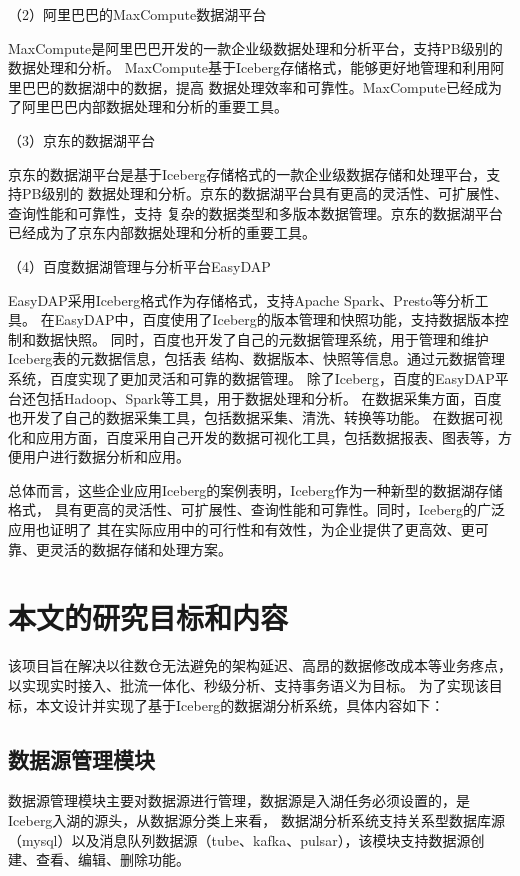 （2）阿里巴巴的MaxCompute数据湖平台

MaxCompute是阿里巴巴开发的一款企业级数据处理和分析平台，支持PB级别的数据处理和分析\cite{39}。
MaxCompute基于Iceberg存储格式，能够更好地管理和利用阿里巴巴的数据湖中的数据，提高
数据处理效率和可靠性。MaxCompute已经成为了阿里巴巴内部数据处理和分析的重要工具。

（3）京东的数据湖平台

京东的数据湖平台是基于Iceberg存储格式的一款企业级数据存储和处理平台，支持PB级别的
数据处理和分析。京东的数据湖平台具有更高的灵活性、可扩展性、查询性能和可靠性，支持
复杂的数据类型和多版本数据管理。京东的数据湖平台已经成为了京东内部数据处理和分析的重要工具。

（4）百度数据湖管理与分析平台EasyDAP

EasyDAP采用Iceberg格式作为存储格式，支持Apache Spark、Presto等分析工具。
在EasyDAP中，百度使用了Iceberg的版本管理和快照功能，支持数据版本控制和数据快照。
同时，百度也开发了自己的元数据管理系统，用于管理和维护Iceberg表的元数据信息，包括表
结构、数据版本、快照等信息。通过元数据管理系统，百度实现了更加灵活和可靠的数据管理。
除了Iceberg，百度的EasyDAP平台还包括Hadoop、Spark等工具，用于数据处理和分析。
在数据采集方面，百度也开发了自己的数据采集工具，包括数据采集、清洗、转换等功能。
在数据可视化和应用方面，百度采用自己开发的数据可视化工具，包括数据报表、图表等，方便用户进行数据分析和应用。

总体而言，这些企业应用Iceberg的案例表明，Iceberg作为一种新型的数据湖存储格式，
具有更高的灵活性、可扩展性、查询性能和可靠性。同时，Iceberg的广泛应用也证明了
其在实际应用中的可行性和有效性，为企业提供了更高效、更可靠、更灵活的数据存储和处理方案。

\section{本文的研究目标和内容}

该项目旨在解决以往数仓无法避免的架构延迟、高昂的数据修改成本等业务疼点，以实现实时接入、批流一体化、秒级分析、支持事务语义为目标。
为了实现该目标，本文设计并实现了基于Iceberg的数据湖分析系统，具体内容如下：

\subsection{数据源管理模块}

数据源管理模块主要对数据源进行管理，数据源是入湖任务必须设置的，是Iceberg入湖的源头，从数据源分类上来看，
数据湖分析系统支持关系型数据库源（mysql）以及消息队列数据源（tube、kafka\cite{31,40}、pulsar\cite{17}），该模块支持数据源创建、查看、编辑、删除功能。

